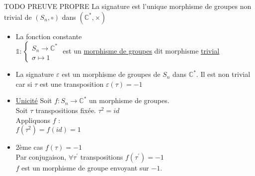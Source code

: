 \documentclass[11pt]{article}
\newcommand*{\C}{\mathbb{C}}
\newcommand*{\n}{\\[0.2cm]}
\newcommand{\0}{\varnothing}
\newcommand*{\e}{\varepsilon}
\newcommand*{\s}{\sigma}
\begin{document}
\begin{corr}{TODO PREUVE PROPRE}{}
    La signature est l'unique morphisme de groupes non trivial de $(S_{n}, \circ)$ dans $(\C^{*}, \times)$
    \tcblower
    \begin{itemize}
        \item La fonction constante \n
        $\mathds{1} : \left\{ \begin{array}{ll}
             S_{n} \to \C^{*}  \\
             \s \mapsto 1
        \end{array}\right.$ est un \underline{morphisme de groupes} dit morphisme \underline{trivial}
        \item La signature $\e$ est un morphisme de groupes de $S_{n}$ dans $\C^{*}$. Il est non trivial car si $\tau$ est une transposition $\e(\tau) = -1$
        \item \underline{Unicité} Soit $f : S_{n} \to \C^{*}$ un morphisme de groupes.\n
        Soit $\tau$ transpositions fixée. $\tau^{2} = id$\n
        Appliquons $f$ :\n
        $f(\tau^{2}) = f(id) = 1$

        \item 2ème cas $f(\tau) = -1$\n
        Par conjugaison, $\forall \tau^{'}$ transpositions $f(\tau^{'}) = -1$\n
        $f$ est un morphisme de groupe envoyant sur $-1$.
    \end{itemize}
\end{corr}
\end{document}
